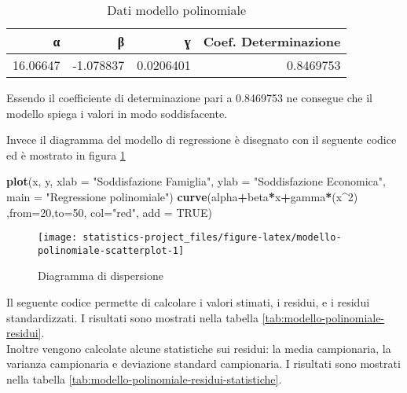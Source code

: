 \documentclass[]{book}
\newenvironment{Shaded}{\begin{snugshade}}{\end{snugshade}}
\newcommand{\KeywordTok}[1]{\textcolor[rgb]{0.13,0.29,0.53}{\textbf{#1}}}
\newcommand{\DataTypeTok}[1]{\textcolor[rgb]{0.13,0.29,0.53}{#1}}
\newcommand{\DecValTok}[1]{\textcolor[rgb]{0.00,0.00,0.81}{#1}}
\newcommand{\StringTok}[1]{\textcolor[rgb]{0.31,0.60,0.02}{#1}}
\newcommand{\OtherTok}[1]{\textcolor[rgb]{0.56,0.35,0.01}{#1}}
\newcommand{\OperatorTok}[1]{\textcolor[rgb]{0.81,0.36,0.00}{\textbf{#1}}}
\newcommand{\NormalTok}[1]{#1}
\begin{document}
\begin{table}

\caption{\label{tab:modello-polinomiale-dati}Dati modello polinomiale}
\centering
\begin{tabular}[t]{r|r|r|r}
\hline
α & β & ɣ & Coef. Determinazione\\
\hline
16.06647 & -1.078837 & 0.0206401 & 0.8469753\\
\hline
\end{tabular}
\end{table}

Essendo il coefficiente di determinazione pari a 0.8469753 ne consegue
che il modello spiega i valori in modo soddisfacente.

Invece il diagramma del modello di regressione è disegnato con il
seguente codice ed è mostrato in figura
\ref{fig:modello-polinomiale-scatterplot}

\begin{Shaded}
\begin{Highlighting}[]
\KeywordTok{plot}\NormalTok{(x, y, }\DataTypeTok{xlab =} \StringTok{"Soddisfazione Famiglia"}\NormalTok{, }
     \DataTypeTok{ylab =} \StringTok{"Soddisfazione Economica"}\NormalTok{,}
     \DataTypeTok{main =} \StringTok{"Regressione polinomiale"}\NormalTok{)}
\KeywordTok{curve}\NormalTok{(alpha}\OperatorTok{+}\NormalTok{beta}\OperatorTok{*}\NormalTok{x}\OperatorTok{+}\NormalTok{gamma}\OperatorTok{*}\NormalTok{(x}\OperatorTok{^}\DecValTok{2}\NormalTok{) ,}\DataTypeTok{from=}\DecValTok{20}\NormalTok{,}\DataTypeTok{to=}\DecValTok{50}\NormalTok{, }\DataTypeTok{col=}\StringTok{"red"}\NormalTok{, }\DataTypeTok{add =} \OtherTok{TRUE}\NormalTok{)}
\end{Highlighting}
\end{Shaded}

\begin{figure}

{\centering \texttt{[image: statistics-project\_files/figure-latex/modello-polinomiale-scatterplot-1]} 

}

\caption{Diagramma di dispersione}\label{fig:modello-polinomiale-scatterplot}
\end{figure}

Il seguente codice permette di calcolare i valori stimati, i residui, e
i residui standardizzati. I risultati sono mostrati nella tabella
\ref{tab:modello-polinomiale-residui}.\\
Inoltre vengono calcolate alcune statistiche sui residui: la media
campionaria, la varianza campionaria e deviazione standard campionaria.
I risultati sono mostrati nella tabella
\ref{tab:modello-polinomiale-residui-statistiche}.
\end{document}
